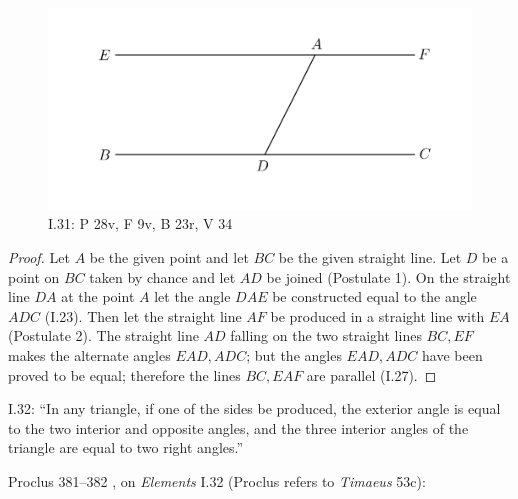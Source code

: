\documentclass{article}
\begin{document}
\begin{figure}
\begin{center}
\includegraphics{I31.png}
\end{center}
\caption{I.31: P 28v, F 9v, B 23r, V 34}
\label{I31}
\end{figure}

\begin{proof}
Let $A$ be the given point and let $BC$ be the given straight line. Let $D$ be a point on $BC$ taken by chance
and let $AD$ be joined (Postulate 1).
On the straight line $DA$ at the point $A$ let the angle $DAE$ be constructed equal
to the angle $ADC$ (I.23).
Then let the straight line $AF$ be produced in a straight line with $EA$ (Postulate 2).
The straight line $AD$ falling on the two straight lines $BC,EF$ makes the alternate angles
$EAD,ADC$; but the angles $EAD,ADC$ have been proved to be equal; therefore
the lines $BC,EAF$ are parallel (I.27).
\end{proof}


I.32: ``In any triangle, if one of the sides be produced, the exterior
angle is equal to the two interior and opposite angles, and the
three interior angles of the triangle are equal to two right
angles.''

Proclus 381--382 \cite[pp.~300--301]{proclus}, on {\em Elements} I.32 (Proclus refers to {\em Timaeus} 53c):
\end{document}
